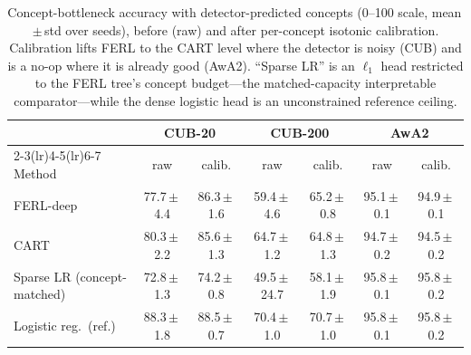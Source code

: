 \begin{table}[t]
\centering
\small
\caption{Concept-bottleneck accuracy with detector-predicted concepts (0--100 scale, mean\,$\pm$\,std over seeds), before (raw) and after per-concept isotonic calibration. Calibration lifts FERL to the CART level where the detector is noisy (CUB) and is a no-op where it is already good (AwA2). ``Sparse LR'' is an $\ell_1$ head restricted to the FERL tree's concept budget---the matched-capacity interpretable comparator---while the dense logistic head is an unconstrained reference ceiling.}
\label{tab:cbm}
\footnotesize
\setlength{\tabcolsep}{2.5pt}
\begin{tabular}{@{}lcccccc@{}}
\toprule
& \multicolumn{2}{c}{CUB-20} & \multicolumn{2}{c}{CUB-200} & \multicolumn{2}{c}{AwA2}\\
\cmidrule(lr){2-3}\cmidrule(lr){4-5}\cmidrule(lr){6-7}
Method & raw & calib. & raw & calib. & raw & calib.\\
\midrule
FERL-deep & 77.7\,$\pm$\,4.4 & 86.3\,$\pm$\,1.6 & 59.4\,$\pm$\,4.6 & 65.2\,$\pm$\,0.8 & 95.1\,$\pm$\,0.1 & 94.9\,$\pm$\,0.1\\
CART & 80.3\,$\pm$\,2.2 & 85.6\,$\pm$\,1.3 & 64.7\,$\pm$\,1.2 & 64.8\,$\pm$\,1.3 & 94.7\,$\pm$\,0.2 & 94.5\,$\pm$\,0.2\\
Sparse LR (concept-matched) & 72.8\,$\pm$\,1.3 & 74.2\,$\pm$\,0.8 & 49.5\,$\pm$\,24.7 & 58.1\,$\pm$\,1.9 & 95.8\,$\pm$\,0.1 & 95.8\,$\pm$\,0.2\\
Logistic reg.\ (ref.) & 88.3\,$\pm$\,1.8 & 88.5\,$\pm$\,0.7 & 70.4\,$\pm$\,1.0 & 70.7\,$\pm$\,1.0 & 95.8\,$\pm$\,0.1 & 95.8\,$\pm$\,0.2\\
\bottomrule
\end{tabular}
\end{table}

